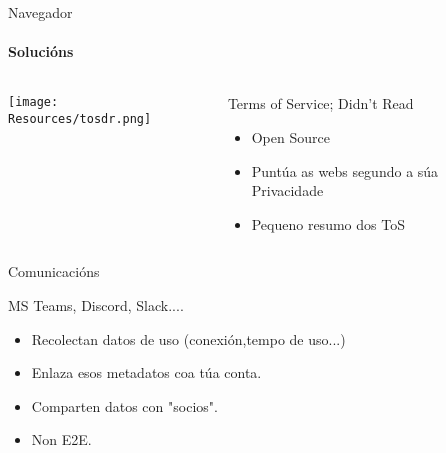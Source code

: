 \documentclass{beamer}
\begin{document}
\begin{frame}{Navegador}
  \framesubtitle{Solucións}

  \begin{columns}
    \begin{column}{0.5\textwidth}
      \texttt{[image: Resources/tosdr.png]}

      \vspace{1cm}


    \end{column}

    \begin{column}{0.4\textwidth}
      \begin{block}{Terms of Service; Didn’t Read}
        \begin{itemize}
          \item Open Source
          \item Puntúa as webs segundo a súa Privacidade
          \item Pequeno resumo dos ToS
        \end{itemize}
      \end{block}

    \end{column}

  \end{columns}

\end{frame}



\begin{frame}{Comunicacións}
  \subtitle{Problema}

  \begin{block}{MS Teams, Discord, Slack....}

    \begin{itemize}
      \item Recolectan datos de uso (conexión,tempo de uso...)
      \item Enlaza esos metadatos coa túa conta.
      \item Comparten datos con "socios".
      \item Non E2E.
    \end{itemize}

  \end{block}

\end{frame}
\end{document}
